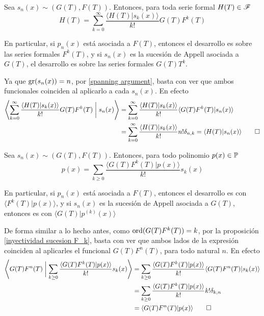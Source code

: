 \begin{teorema}[de expansión] \label{teorema de expansion}
    Sea $s_n(x) \sim (G(T), F(T))$. Entonces, para toda serie formal $H(T) \in \mathscr{F}$
    \begin{equation*}
        H(T) = \sum_{k = 0}^\infty \frac{\langle H(T)| s_k(x)\rangle}{k!}G(T)F^k(T)
    \end{equation*}

    En particular, si $p_n(x)$ está asociada a $F(T)$, entonces el desarrollo es sobre las series formales $F^k(T)$, y si $s_n(x)$ es la sucesión de Appell asociada a $G(T)$, el desarrollo es sobre las series formales $G(T)T^k$.
\end{teorema}

\begin{demo}
    Ya que $\operatorname{gr}(s_n(x)) = n$, por \ref{spanning argument}, basta con ver que ambos funcionales coinciden al aplicarlo a cada $s_n(x)$. En efecto
    \begin{align*}
        \left\langle \sum_{k = 0}^\infty \frac{\langle H(T)| s_k(x) \rangle}{k!}G(T)F^k(T) \biggm| s_n(x) \right\rangle & = \sum_{k = 0}^\infty \frac{\langle H(T)| s_k(x) \rangle}{k!} \langle G(T)F^k(T) | s_n(x) \rangle\\
        & = \sum_{k = 0}^\infty \frac{\langle H(T)| s_k(x) \rangle}{k!} n!\delta_{n,k} = \langle H(T)| s_n(x) \rangle \qedhere
    \end{align*}
\end{demo}

\begin{teorema}\label{teorema de expansion polinomico}
    Sea $s_n(x) \sim (G(T), F(T))$. Entonces, para todo polinomio $p(x) \in \mathbb{P}$
    \begin{equation*}
        p(x) = \sum_{k \geq 0} \frac{\langle G(T)F^k(T) | p(x) \rangle}{k!}s_k(x)
    \end{equation*}

    En particular, si $p_n(x)$ está asociada a $F(T)$, entonces el desarrollo es con $\langle F^k(T) | p(x) \rangle$, y si $s_n(x)$ es la sucesión de Appell asociada a $G(T)$, entonces es con $\langle G(T) | p^{(k)}(x) \rangle$
\end{teorema}

\begin{demo}
    De forma similar a lo hecho antes, como $\operatorname*{ord}(G(T)F^k(T)) = k$, por la proposición \ref{inyectividad sucesion F_k}, basta con ver que ambos lados de la expresión coinciden al aplicarles el funcional $G(T)F^n(T)$, para todo natural $n$. En efecto
    \begin{align*}
        \left\langle G(T)F^n(T) \biggm| \sum_{k \geq 0} \frac{\langle G(T)F^k(T) | p(x) \rangle}{k!}s_k(x) \right\rangle & = \sum_{k \geq 0} \frac{\langle G(T)F^k(T) | p(x) \rangle}{k!}\langle G(T)F^n(T) | s_k(x) \rangle\\
        & = \sum_{k \geq 0} \frac{\langle G(T)F^k(T) | p(x) \rangle}{k!}k! \delta_{k,n} \\
        & = \langle G(T)F^n(T) | p(x) \rangle \qedhere
    \end{align*}
\end{demo}

